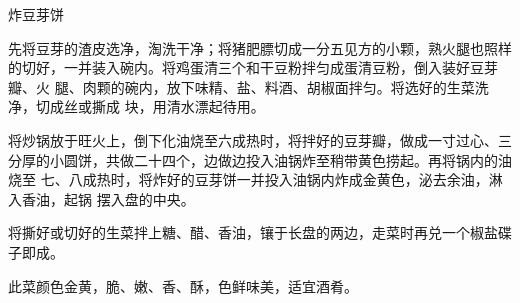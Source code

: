 \begin{recipe}{炸豆芽饼}

\ingredients


\preparation

\step 先将豆芽的渣皮选净，淘洗干净；将猪肥膘切成一分五见方的小颗，熟火腿也照样
的切好，一并装入碗内。将鸡蛋清三个和干豆粉拌匀成蛋清豆粉，倒入装好豆芽瓣、火
腿、肉颗的碗内，放下味精、盐、料酒、胡椒面拌匀。将选好的生菜洗净，切成丝或撕成
块，用清水漂起待用。

\step 将炒锅放于旺火上，倒下化油烧至六成热时，将拌好的豆芽瓣，做成一寸过心、三
分厚的小圆饼，共做二十四个，边做边投入油锅炸至稍带黄色捞起。再将锅内的油烧至
七、八成热时，将炸好的豆芽饼一并投入油锅内炸成金黄色，泌去余油，淋入香油，起锅
摆入盘的中央。

\step 将撕好或切好的生菜拌上糖、醋、香油，镶于长盘的两边，走菜时再兑一个椒盐碟
子即成。

\features

此菜颜色金黄，脆、嫩、香、酥，色鲜味美，适宜酒肴。

\end{recipe}

